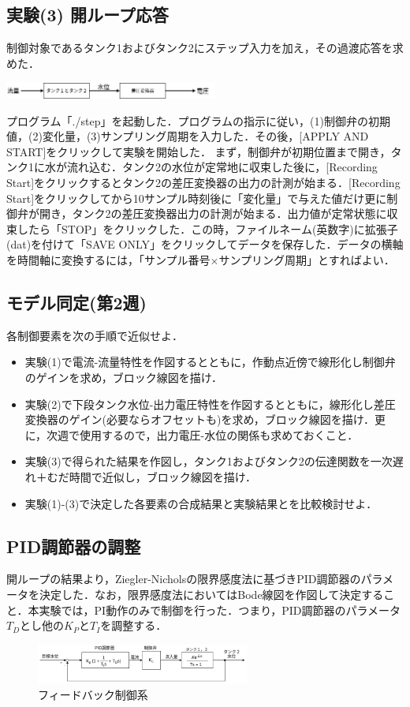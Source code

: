 \documentclass[12pt]{jsarticle}
\begin{document}
\subsection{実験(3) 開ループ応答}
制御対象であるタンク1およびタンク2にステップ入力を加え，その過渡応答を求めた．
\begin{center}
  \includegraphics[clip,width=7.0cm]{../img/OpenResponse.png}
\end{center}
プログラム「./step」を起動した．プログラムの指示に従い，(1)制御弁の初期値，(2)変化量，(3)サンプリング周期を入力した．その後，[APPLY AND START]をクリックして実験を開始した．
まず，制御弁が初期位置まで開き，タンク1に水が流れ込む．タンク2の水位が定常地に収束した後に，[Recording Start]をクリックするとタンク2の差圧変換器の出力の計測が始まる．[Recording Start]をクリックしてから10サンプル時刻後に「変化量」で与えた値だけ更に制御弁が開き，タンク2の差圧変換器出力の計測が始まる．出力値が定常状態に収束したら「STOP」をクリックした．この時，ファイルネーム(英数字)に拡張子(dat)を付けて「SAVE ONLY」をクリックしてデータを保存した．データの横軸を時間軸に変換するには，「サンプル番号×サンプリング周期」とすればよい．
\subsection{モデル同定(第2週)}
各制御要素を次の手順で近似せよ．
\begin{itemize}
\item 実験(1)で電流-流量特性を作図するとともに，作動点近傍で線形化し制御弁のゲインを求め，ブロック線図を描け．
\item 実験(2)で下段タンク水位-出力電圧特性を作図するとともに，線形化し差圧変換器のゲイン(必要ならオフセットも)を求め，ブロック線図を描け．更に，次週で使用するので，出力電圧-水位の関係も求めておくこと．
\item 実験(3)で得られた結果を作図し，タンク1およびタンク2の伝達関数を一次遅れ＋むだ時間で近似し，ブロック線図を描け．
\item 実験(1)-(3)で決定した各要素の合成結果と実験結果とを比較検討せよ．
\end{itemize}
\subsection{PID調節器の調整}
開ループの結果より，Ziegler-Nicholsの限界感度法に基づきPID調節器のパラメータを決定した．なお，限界感度法においてはBode線図を作図して決定すること．本実験では，PI動作のみで制御を行った．つまり，PID調節器のパラメータ$T_D$とし他の$K_P$と$T_I$を調整する．
\begin{figure}[tb]
  \begin{center}
    \includegraphics[clip,width=7.0cm]{../img/PIDController.png}
    \caption{フィードバック制御系}
    \label{FeedbackController}
  \end{center}
\end{figure}
\end{document}

